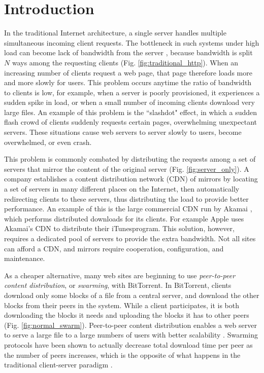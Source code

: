\section {Introduction}

In the traditional Internet architecture, a single server handles multiple simultaneous incoming client requests.  
The bottleneck in such systems under high load can become lack of bandwidth from the server \cite{coopnet}, because bandwidth is split $N$ 
ways among the requesting clients (Fig. \ref{fig:traditional_http}).  When an increasing number of clients request a web page, that page 
therefore loads more and more slowly for users.  This problem occurs anytime the ratio of bandwidth to clients is low, for example, when a server 
is poorly provisioned, it experiences a sudden spike in load, or when a small number of incoming clients download very large files.  An example of this problem 
is the ``slashdot" effect, in which a sudden flash crowd of clients suddenly requests certain pages, overwhelming unexpectant servers.  
These situations cause web servers to server slowly to users, become overwhelmed, or even crash.

This problem is commonly combated by distributing the requests among a set of servers that mirror the content of the original server (Fig. \ref{fig:server_only}).  
A company establishes a content distribution network (CDN) of mirrors by locating a set of servers in many different places on the Internet, then automatically redirecting clients to these servers, thus 
distributing the load to provide better performance.  An example of this is the large commercial CDN run by Akamai \cite{akamai}, which performs distributed
downloads for its clients.  For example Apple uses Akamai's CDN to distribute their iTunes\texttrademark  program.  This solution,  however, requires a dedicated pool of 
servers to provide the extra bandwidth.  Not all sites can afford a CDN, and  mirrors require cooperation, configuration, and maintenance.

As a cheaper alternative, many web sites are beginning to use \emph{peer-to-peer content distribution}, or \emph{swarming}, with BitTorrent.  In BitTorrent, clients 
download only some blocks of a file from a central server, and download the other blocks from their peers in the system.  While a client participates, it is both downloading 
the  blocks it needs and uploading the blocks it has to other peers (Fig. \ref{fig:normal_swarm}).  Peer-to-peer content distribution enables a 
web server to serve a large file to a large numbers of users with better scalability \cite{zappala}. Swarming protocols have been shown to actually decrease total download 
time per peer as the number of peers increases, which is the opposite of what happens in the traditional client-server paradigm \cite{slurpie}. 

